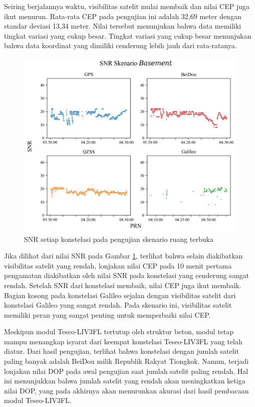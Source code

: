 Seiring berjalannya waktu, visibilitas satelit mulai membaik dan nilai CEP juga ikut menurun. Rata-rata CEP pada pengujian ini adalah 32,69 meter dengan standar deviasi 13,34 meter. Nilai tersebut menunjukan bahwa data memiliki tingkat variasi yang cukup besar. Tingkat variasi yang cukup besar menunjukan bahwa data koordinat yang dimiliki cenderung lebih jauh dari rata-ratanya.

\begin{figure}[H]
	\centering
	\includegraphics[width=13cm]{contents/chapter-4/1-skenario-basement/snr.png}
	\caption{SNR setiap konstelasi pada pengujian skenario ruang terbuka}
	\label{Fig: basement-snr}
\end{figure}

Jika dilihat dari nilai SNR pada Gambar \ref{Fig: basement-snr}, terlihat bahwa selain diakibatkan visibilitas satelit yang rendah, lonjakan nilai CEP pada 10 menit pertama pengamatan diakibatkan oleh nilai SNR pada konstelasi yang cenderung sangat rendah. Setelah SNR dari konstelasi membaik, nilai CEP juga ikut membaik. Bagian kosong pada konstelasi Galileo sejalan dengan visibilitas satelit dari konstelasi Galileo yang sangat rendah. Pada skenario ini, visibilitas satelit memiliki peran yang sangat penting untuk memperbaiki nilai CEP.

Meskipun modul Teseo\hyp{}LIV3FL tertutup oleh struktur beton, modul tetap mampu menangkap isyarat dari keempat konstelasi Teseo\hyp{}LIV3FL yang telah diatur. Dari hasil pengujian, terlihat bahwa konstelasi dengan jumlah satelit paling banyak adalah BeiDou milik Republik Rakyat Tiongkok. Namun, terjadi lonjakan nilai DOP pada awal pengujian saat jumlah satelit paling rendah. Hal ini menunjukkan bahwa jumlah satelit yang rendah akan meningkatkan ketiga nilai DOP, yang pada akhirnya akan menurunkan akurasi dari hasil pembacaan modul Teseo\hyp{}LIV3FL.

